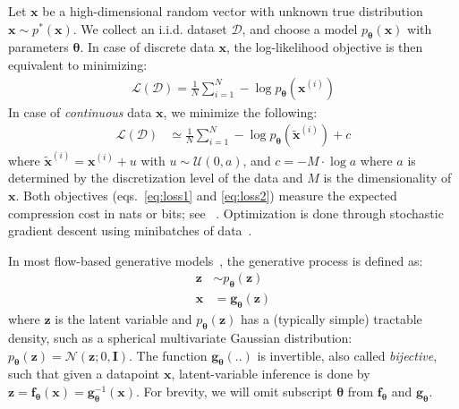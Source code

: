 \documentclass{article}
\newcommand{\bb}[1]{\mathbf{#1}}
\newcommand{\bx}{\bb{x}}
\newcommand{\bg}{\bb{g}}
\newcommand{\bz}{\bb{z}}
\newcommand{\bbf}{\bb{f}}
\newcommand{\bT}{\boldsymbol{\theta}}
\newcommand{\pT}{p_{\bT}}
\newcommand{\fT}{\bbf_{\bT}}
\newcommand{\gT}{\bg_{\bT}}
\begin{document}
Let $\bx$ be a high-dimensional random vector with unknown true distribution $\bx \sim p^*(\bx)$.
We collect an i.i.d. dataset $\mathcal{D}$, and choose a model $\pT(\bx)$ with parameters $\bT$. In case of discrete data $\bx$, the log-likelihood objective is then equivalent to minimizing:
\begin{align}
    \mathcal{L}(\mathcal{D}) = \frac{1}{N} \sum_{i=1}^N - \log \pT(\bx^{(i)})
\label{eq:loss1}\end{align}
In case of \emph{continuous} data $\bx$, we minimize the following:
\begin{align}
    \mathcal{L}(\mathcal{D})
    &\simeq \frac{1}{N} \sum_{i=1}^N - \log \pT(\tilde{\bx}^{(i)}) + c
\label{eq:loss2}\end{align}
where $\tilde{\bx}^{(i)} = \bx^{(i)} + u$ with $u \sim \mathcal{U}(0, a)$, and $c = - M \cdot \log a$ where $a$ is determined by the discretization level of the data and $M$ is the dimensionality of $\bx$. Both objectives (eqs.~\eqref{eq:loss1} and \eqref{eq:loss2}) measure the expected compression cost in nats or bits; see ~\citep{dinh2016density}. Optimization is done through stochastic gradient descent using minibatches of data~\citep{kingma2015adam}.

In most flow-based generative models~\citep{dinh2014nice,dinh2016density}, the generative process is defined as:
\begin{align}
\bz &\sim \pT(\bz)\\
\bx &= \gT(\bz)\label{eq:changeofvariables}
\end{align}
where $\bz$ is the latent variable and $\pT(\bz)$ has a (typically simple) tractable density, such as a spherical multivariate Gaussian distribution: $\pT(\bz) = \mathcal{N}(\bz; 0, \mathbf{I})$. The function $\gT(..)$ is invertible, also called \emph{bijective}, such that given a datapoint $\bx$, latent-variable inference is done by $\bz = \fT(\bx) = \gT^{-1}(\bx)$. For brevity, we will omit subscript $\bT$ from $\fT$ and $\gT$.
\end{document}

